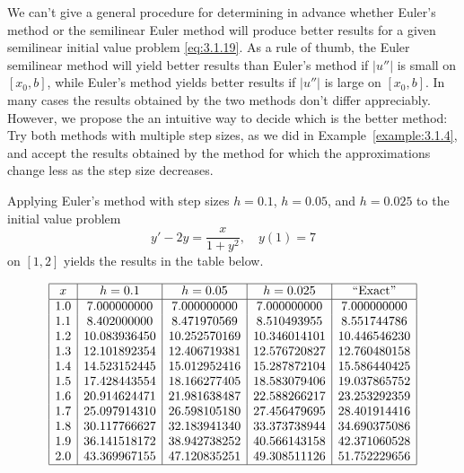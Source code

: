 \documentclass{ximera}
\begin{document}
We can't give a general procedure for determining in advance
whether Euler's method or the semilinear Euler method will produce
better results for a given semilinear initial value problem
\eqref{eq:3.1.19}.
 As a rule of thumb, the Euler semilinear method will
yield better results than Euler's method if $|u''|$ is small on
$[x_0,b]$, while Euler's method  yields better results if $|u''|$
is large on $[x_0,b]$.
 In many cases the results obtained by the two methods don't
 differ appreciably. However, we propose the an intuitive
way to decide which is the better method: Try both methods with
multiple step sizes, as we did in Example~\ref{example:3.1.4},
 and accept the results obtained by the method for
which the approximations change less as the step size decreases.

\begin{example}\label{example:3.1.5}
Applying Euler's method with step sizes $h=0.1$, $h=0.05$, and
$h=0.025$ to the initial value problem
\begin{equation}\label{eq:3.1.25}
y'-2y=\frac{x}{1+y^2},\quad y(1)=7
\end{equation}
on $[1,2]$ yields the results in
the table below. 

$$
\begin{array}{|c|c|c|c|c|}
\hline
x&
h=0.1&
h=0.05&
h=0.025&
\text{``Exact''} \\ \hline
1.0 &  7.000000000 &  7.000000000 &  7.000000000 &  7.000000000\\
1.1 &  8.402000000 &  8.471970569 &  8.510493955 &  8.551744786\\
1.2 & 10.083936450 & 10.252570169 & 10.346014101 & 10.446546230\\
1.3 & 12.101892354 & 12.406719381 & 12.576720827 & 12.760480158\\
1.4 & 14.523152445 & 15.012952416 & 15.287872104 & 15.586440425\\
1.5 & 17.428443554 & 18.166277405 & 18.583079406 & 19.037865752\\
1.6 & 20.914624471 & 21.981638487 & 22.588266217 & 23.253292359\\
1.7 & 25.097914310 & 26.598105180 & 27.456479695 & 28.401914416\\
1.8 & 30.117766627 & 32.183941340 & 33.373738944 & 34.690375086\\
1.9 & 36.141518172 & 38.942738252 & 40.566143158 & 42.371060528\\
2.0 & 43.369967155 & 47.120835251 & 49.308511126 & 51.752229656\\
\hline
\end{array}
$$




\end{example}
\end{document}
